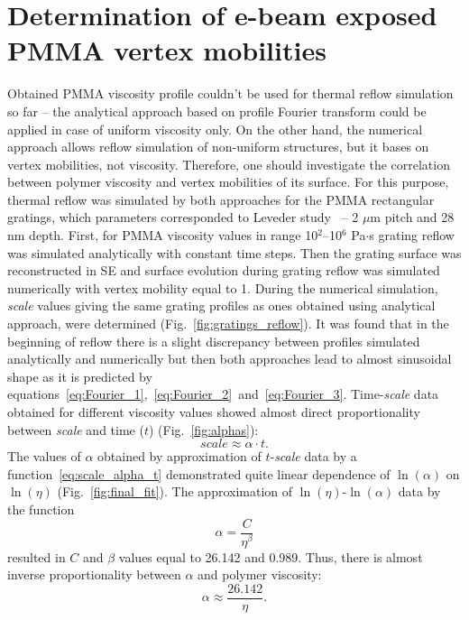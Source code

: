 \section{Determination of e-beam exposed PMMA vertex mobilities}

Obtained PMMA viscosity profile couldn't be used for thermal reflow simulation so far -- the analytical approach based on profile Fourier transform could be applied in case of uniform viscosity only.
On the other hand, the numerical approach allows reflow simulation of non-uniform structures, but it bases on vertex mobilities, not viscosity.
Therefore, one should investigate the correlation between polymer viscosity and vertex mobilities of its surface.
For this purpose, thermal reflow was simulated by both approaches for the PMMA rectangular gratings, which parameters corresponded to Leveder study~\cite{Leveder_2010} -- 2 $\mu$m pitch and 28 nm depth.
First, for PMMA viscosity values in range 10$^2$--10$^6$ Pa$\cdot$s grating reflow was simulated analytically with constant time steps.
Then the grating surface was reconstructed in SE and surface evolution during grating reflow was simulated numerically with vertex mobility equal to 1.
During the numerical simulation, \textit{scale} values giving the same grating profiles as ones obtained using analytical approach, were determined (Fig.~\ref{fig:gratings_reflow}).
It was found that in the beginning of reflow there is a slight discrepancy between profiles simulated analytically and numerically but then both approaches lead to almost sinusoidal shape as it is predicted by equations~\ref{eq:Fourier_1},~\ref{eq:Fourier_2}~and~\ref{eq:Fourier_3}.
Time-\textit{scale} data obtained for different viscosity values showed almost direct proportionality between \textit{scale} and time ($t$) (Fig.~\ref{fig:alphas}):
\begin{equation} \label{eq:scale_alpha_t}
	scale \approx \alpha \cdot t.
\end{equation}
The values of $\alpha$ obtained by approximation of $t$-\textit{scale} data by a function~\ref{eq:scale_alpha_t} demonstrated quite linear dependence of $\ln(\alpha)$ on $\ln(\eta)$ (Fig.~\ref{fig:final_fit}).
The approximation of $\ln(\eta)$-$\ln(\alpha)$ data by the function
\begin{equation}
	\alpha = \frac{C}{\eta^\beta}
\end{equation}
resulted in $C$ and $\beta$ values equal to 26.142 and 0.989.
Thus, there is almost inverse proportionality between $\alpha$ and polymer viscosity:
\begin{equation}
	\alpha \approx \frac{26.142}{\eta}.
\end{equation}

